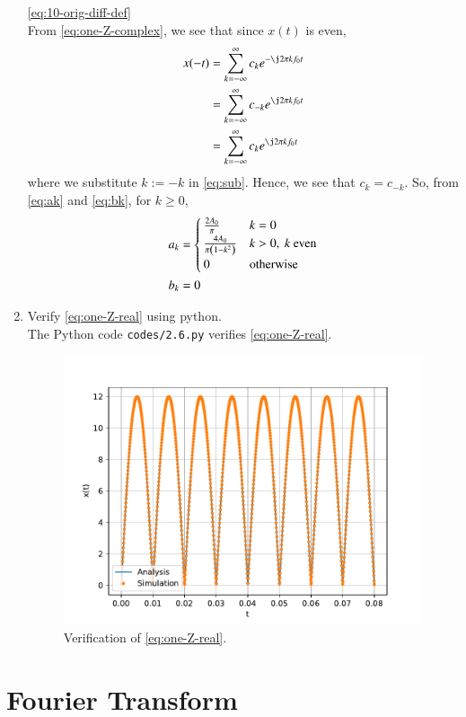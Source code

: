 \documentclass[journal,12pt,twocolumn]{IEEEtran}
\renewcommand\thesection{\arabic{section}}
\begin{document}
\begin{enumerate}[label=\thesection.\arabic*,ref=\thesection.\theenumi]
\eqref{eq:10-orig-diff-def} \\
\solution From \eqref{eq:one-Z-complex}, we see that since $x(t)$ is even,
\begin{align}
x(-t) &= \sum_{k = -\infty}^{\infty}c_ke^{-\j2\pi kf_0 t} \\
&= \sum_{k = -\infty}^{\infty}c_{-k}e^{\j2\pi kf_0t} \label{eq:sub} \\
&= \sum_{k = -\infty}^{\infty}c_ke^{\j2\pi kf_0 t}
\end{align}
where we substitute $k := -k$ in \eqref{eq:sub}. Hence, we see that
$c_k = c_{-k}$. So, from \eqref{eq:ak} and \eqref{eq:bk}, for $k \ge 0$,
\begin{align}
a_k &=
\begin{cases}
\frac{2A_0}{\pi} & k = 0 \\
\frac{4A_0}{\pi\left(1 - k^2\right)} & k > 0,\ k\ \text{even} \\
0 & \text{otherwise}
\end{cases} \label{eq:ak-xt}\\
b_k &= 0
\label{eq:bk-xt}
\end{align}
\item Verify
\eqref{eq:one-Z-real}
using python. \\
\solution The Python code \texttt{codes/2.6.py} verifies \eqref{eq:one-Z-real}.
\begin{figure}[!ht]
\includegraphics[width=\columnwidth]{figs/2.6.pdf}
\caption{Verification of \eqref{eq:one-Z-real}.}
\label{fig:ver-real}
\end{figure}
\end{enumerate}
\section{Fourier Transform}
\end{document}
